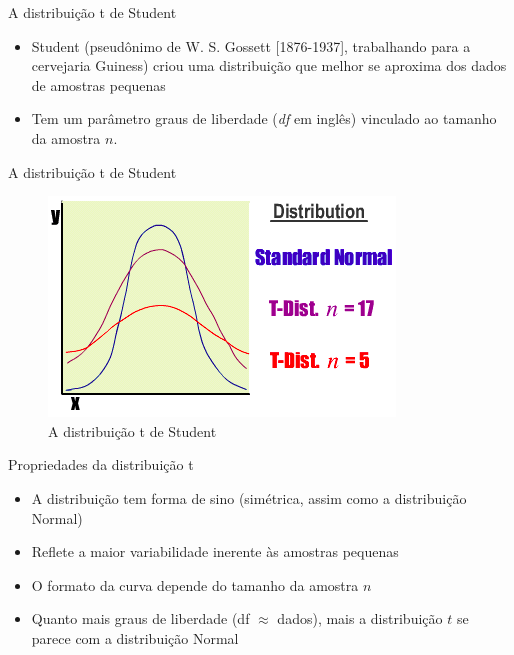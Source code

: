 \documentclass{beamer}
\begin{document}
\begin{frame}{A distribuição t de Student}
  \begin{itemize}
  \item Student (pseudônimo de W. S. Gossett [1876-1937], trabalhando
    para a cervejaria Guiness) criou uma distribuição que melhor se
    aproxima dos dados de amostras pequenas
  \item Tem um parâmetro \alert{graus de liberdade} ({\em df} em inglês) vinculado ao tamanho da amostra $n$.
  \end{itemize}
\end{frame}

\begin{frame}{A distribuição t de Student}
  \begin{figure}
    \includegraphics[height=0.7\textheight]{Inf_II/t_graph}
    \caption{A distribuição t de Student}
  \end{figure}
\end{frame}

\begin{frame}{Propriedades da distribuição t}
  \begin{itemize}
  \item A distribuição tem forma de sino (simétrica, assim como a
    distribuição Normal)
  \item Reflete a maior variabilidade inerente às amostras pequenas
  \item O formato da curva depende do tamanho da amostra $n$
  \item Quanto mais graus de liberdade (df $\approx$ dados), mais a distribuição
    $t$ se parece com a distribuição Normal
  \end{itemize}
\end{frame}
\end{document}
